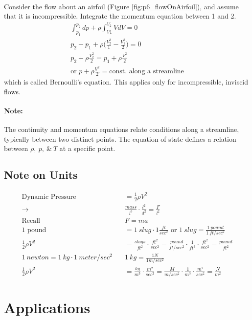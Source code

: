 \documentclass[draft=false, titlepage]{article}
\begin{document}
\paragraph*{} Consider the flow about an airfoil (Figure \ref{fig:p6_flowOnAirfoil}), and assume that it is incompressible. Integrate the momentum equation between 1 and 2.
\begin{gather*}
\int_{p_1}^{p_2} dp + \rho \int_{V1}^{V_2} V dV = 0\\p_2 - p_1 + \rho\big(\frac{V_2^2}{1}-\frac{V_1^2}{2}\big) = 0\\
p_2 + \rho\frac{V_2^2}{2} = p_1 + \rho \frac{V_1^2}{2}\\
\text{or } \boxed{p + \rho \frac{V^2}{2} = \text{const. along a streamline}}
\label{eq:Bernoulli}
\end{gather*}
which is called Bernoulli's equation. This applies only for incompressible, inviscid flows.
\paragraph*{Note:} The continuity and momentum equations relate conditions along a streamline, typically between two distinct points. The equation of state defines a relation between $\rho,\ p,\ \&\ T$ at a specific point.

\subsection{Note on Units}
\begin{align*}
\text{Dynamic Pressure} &\quad = \frac{1}{2}\rho V^2\\
\rightarrow &\quad \frac{mass}{l^3} \cdot \frac{l^2}{d^2} = \frac{F}{l^2}\\
\text{Recall }&\quad F=ma\\
\text{1 pound} &\quad = 1\ slug \cdot 1\frac{ft}{sec^2} \text{ or } 1\ slug = \frac{1\ pound}{1\ ft/sec^2}\\
\frac{1}{2}\rho V^2 &\quad = \frac{slugs}{ft^2} \cdot \frac{ft^2}{sec^2} = \frac{pound}{ft/sec^2}\cdot \frac{1}{ft^3}\cdot \frac{ft^2}{sec^2} = \frac{pound}{ft^2}\\
1\ newton = 1\ kg \cdot 1\ meter/sec^2 &\quad 1\ kg = \frac{1N}{1m/sec^2}\\
\frac{1}{2}\rho V^2 &\quad = \frac{kg}{m^3}\cdot \frac{m^2}{sec^2} = \frac{M}{m/sec^2}\cdot \frac{1}{m^3}\cdot \frac{m^2}{sec^2} = \frac{N}{m^2}
\end{align*}

\section{Applications}
\end{document}
